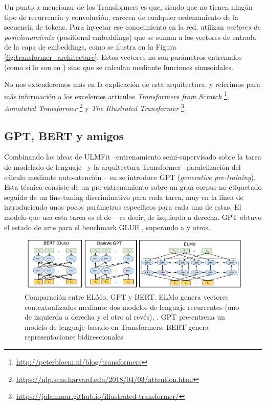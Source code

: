 Un punto a mencionar de los Transformers es que, siendo que no tienen ningún tipo de recurrencia y convolución, carecen de cualquier ordenamiento de la secuencia de tokens. Para inyectar ese conocimiento en la red, utilizan \emph{vectores de posicionamiento} (positional embeddings) que se suman a los vectores de entrada de la capa de embeddings, como se ilustra en la Figura \ref{fig:transformer_architecture}. Estos vectores no son parámetros entrenados (como sí lo son en \bert{}) sino que se calculan mediante funciones sinusoidales.


No nos extenderemos más en la explicación de esta arquitectura, y referimos para más información a los excelentes artículos \emph{Transformers from Scratch} \footnote{\url{http://peterbloem.nl/blog/transformers}}, \emph{Annotated Transformer} \footnote{\url{https://nlp.seas.harvard.edu/2018/04/03/attention.html}} y \emph{The Illustrated Transformer} \footnote{\url{https://jalammar.github.io/illustrated-transformer/}}.


\subsection{GPT, BERT y amigos}

\label{sec:02_bert}

Combinando las ideas de ULMFit --entrenamiento semi-supervisado sobre la tarea de modelado de lenguaje-- y la arquitectura Transformer --paralelización del cálculo mediante auto-atención -- en \citet{radford2018improving} se introduce GPT (\emph{generative pre-training}). Esta técnica consiste de un pre-entrenamiento sobre un gran corpus no etiquetado seguido de un fine-tuning discriminativo para cada tarea, muy en la línea de \citet{howard-ruder-2018-universal} introduciendo unos pocos parámetros específicos para cada una de estas. El modelo que usa esta tarea es el de  -- es decir, de izquierda a derecha. GPT obtuvo el estado de arte para el benchmark GLUE \cite{wang-etal-2018-glue}, superando a \elmo{} y otros.


\begin{figure}[t]
    \centering
    \includegraphics[width=\textwidth]{img/02/gpt_vs_bert.pdf}
    \caption{Comparación entre ELMo, GPT y BERT. ELMo genera vectores contextualizados mediante dos modelos de lenguaje recurrentes (uno de izquierda a derecha y el otro al revés), . GPT pre-entrena un modelo de lenguaje basado en Transformers. BERT genera representaciones bidireccionales }
    \label{fig:gpt_vs_bert_vs_elmo}
\end{figure}


